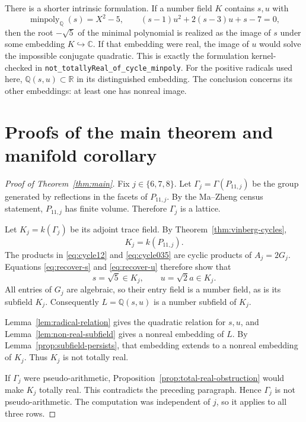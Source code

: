 \documentclass[11pt]{article}
\numberwithin{equation}{section}
\theoremstyle{definition}
\theoremstyle{remark}
\newcommand{\Q}{\mathbb{Q}}
\newcommand{\R}{\mathbb{R}}
\newcommand{\C}{\mathbb{C}}
\newcommand{\minpoly}{\operatorname{minpoly}}
\newcommand{\code}[1]{\texttt{#1}}
\begin{document}
There is a shorter intrinsic formulation.  If a number field \(K\) contains
\(s,u\) with
\[
 \minpoly_\Q(s)=X^2-5,
 \qquad (s-1)u^2+2(s-3)u+s-7=0,
\]
then the root \(-\sqrt5\) of the minimal polynomial is realized as the image
of \(s\) under some embedding \(K\hookrightarrow\C\).  If that embedding
were real, the image of \(u\) would solve the impossible conjugate quadratic.
This is exactly the formulation kernel-checked in
\code{not\_totallyReal\_of\_cycle\_minpoly}.
For the positive radicals used here, \(\Q(s,u)\subset\R\) in its
distinguished embedding.  The conclusion concerns its other embeddings:
at least one has nonreal image.

\section{Proofs of the main theorem and manifold corollary}
\label{sec:main-proof}

\begin{proof}[Proof of Theorem~\ref{thm:main}]
Fix \(j\in\{6,7,8\}\).  Let
\(\Gamma_j=\Gamma(P_{11,j})\) be the group generated by reflections in the
facets of \(P_{11,j}\).  By the Ma--Zheng census statement, \(P_{11,j}\) has
finite volume.  Therefore \(\Gamma_j\) is a lattice.

Let \(K_j=k(\Gamma_j)\) be its adjoint trace field.  By
Theorem~\ref{thm:vinberg-cycles},
\begin{equation}
 K_j=k(P_{11,j}).
\label{eq:vinberg-equality}
\end{equation}
The products in \eqref{eq:cycle12} and \eqref{eq:cycle035} are cyclic
products of \(A_j=2G_j\).  Equations \eqref{eq:recover-s} and
\eqref{eq:recover-u} therefore show that
\[
 s=\sqrt5\in K_j,
 \qquad u=\sqrt2a\in K_j.
\]
All entries of \(G_j\) are algebraic, so their entry field is a number
field, as is its subfield \(K_j\).  Consequently \(L=\Q(s,u)\) is a
number subfield of \(K_j\).

Lemma~\ref{lem:radical-relation} gives the quadratic relation for \(s,u\),
and Lemma~\ref{lem:non-real-subfield} gives a nonreal embedding of \(L\).
By Lemma~\ref{prop:subfield-persists}, that embedding extends to a
nonreal embedding of \(K_j\).  Thus \(K_j\) is not totally real.

If \(\Gamma_j\) were pseudo-arithmetic,
Proposition~\ref{prop:total-real-obstruction} would make \(K_j\) totally
real.  This contradicts the preceding paragraph.  Hence \(\Gamma_j\) is not
pseudo-arithmetic.  The computation was independent of \(j\), so it applies
to all three rows.
\end{proof}
\end{document}
